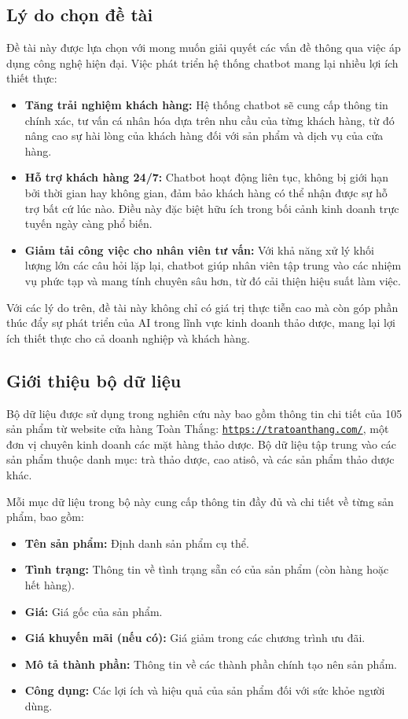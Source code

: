 \documentclass{article}
\numberwithin{equation}{section}
\numberwithin{equation}{section}
\begin{document}
\subsection{Lý do chọn đề tài}
Đề tài này được lựa chọn với mong muốn giải quyết các vấn đề thông qua việc áp dụng công nghệ hiện đại. Việc phát triển hệ thống chatbot mang lại nhiều lợi ích thiết thực:
\begin{itemize}
    \item \textbf{Tăng trải nghiệm khách hàng:} Hệ thống chatbot sẽ cung cấp thông tin chính xác, tư vấn cá nhân hóa dựa trên nhu cầu của từng khách hàng, từ đó nâng cao sự hài lòng của khách hàng đối với sản phẩm và dịch vụ của cửa hàng.
    \item \textbf{Hỗ trợ khách hàng 24/7:} Chatbot hoạt động liên tục, không bị giới hạn bởi thời gian hay không gian, đảm bảo khách hàng có thể nhận được sự hỗ trợ bất cứ lúc nào. Điều này đặc biệt hữu ích trong bối cảnh kinh doanh trực tuyến ngày càng phổ biến.
    \item \textbf{Giảm tải công việc cho nhân viên tư vấn:} Với khả năng xử lý khối lượng lớn các câu hỏi lặp lại, chatbot giúp nhân viên tập trung vào các nhiệm vụ phức tạp và mang tính chuyên sâu hơn, từ đó cải thiện hiệu suất làm việc.
\end{itemize}
Với các lý do trên, đề tài này không chỉ có giá trị thực tiễn cao mà còn góp phần thúc đẩy sự phát triển của AI trong lĩnh vực kinh doanh thảo dược, mang lại lợi ích thiết thực cho cả doanh nghiệp và khách hàng.

\subsection{Giới thiệu bộ dữ liệu}
Bộ dữ liệu được sử dụng trong nghiên cứu này bao gồm thông tin chi tiết của 105 sản phẩm từ website cửa hàng Toàn Thắng: \texttt{\url{https://tratoanthang.com/}}, một đơn vị chuyên kinh doanh các mặt hàng thảo dược. Bộ dữ liệu tập trung vào các sản phẩm thuộc danh mục: trà thảo dược, cao atisô, và các sản phẩm thảo dược khác.

Mỗi mục dữ liệu trong bộ này cung cấp thông tin đầy đủ và chi tiết về từng sản phẩm, bao gồm:

\begin{itemize}
    \item \textbf{Tên sản phẩm:} Định danh sản phẩm cụ thể.
    \item \textbf{Tình trạng:} Thông tin về tình trạng sẵn có của sản phẩm (còn hàng hoặc hết hàng).
    \item \textbf{Giá:} Giá gốc của sản phẩm.
    \item \textbf{Giá khuyến mãi (nếu có):} Giá giảm trong các chương trình ưu đãi.
    \item \textbf{Mô tả thành phần:} Thông tin về các thành phần chính tạo nên sản phẩm.
    \item \textbf{Công dụng:} Các lợi ích và hiệu quả của sản phẩm đối với sức khỏe người dùng.
\end{itemize}
\end{document}

